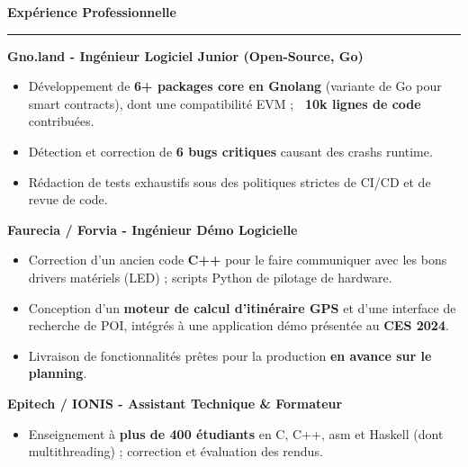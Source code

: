 \documentclass[9pt]{extarticle}
\begin{document}
\par\vspace{5pt}

{\large\bfseries Expérience Professionnelle}
\par\vspace{-8pt}
\rule{\linewidth}{0.4pt}
\par\vspace{5pt}

{\bfseries Gno.land - Ingénieur Logiciel Junior (Open-Source, Go)}
\begin{itemize}[noitemsep, topsep=0pt]
	\item Développement de {\bfseries 6+ packages core en Gnolang} (variante de Go pour smart contracts), dont une compatibilité EVM ; {\bfseries ~10k lignes de code} contribuées.
	\item Détection et correction de {\bfseries 6 bugs critiques} causant des crashs runtime.
	\item Rédaction de tests exhaustifs sous des politiques strictes de CI/CD et de revue de code.
\end{itemize}

\par\vspace{5pt}

{\bfseries Faurecia / Forvia - Ingénieur Démo Logicielle}
\begin{itemize}[noitemsep, topsep=0pt]
	\item Correction d'un ancien code {\bfseries C++} pour le faire communiquer avec les bons drivers matériels (LED) ; scripts Python de pilotage de hardware.
	\item Conception d'un {\bfseries moteur de calcul d'itinéraire GPS} et d'une interface de recherche de POI, intégrés à une application démo présentée au {\bfseries CES 2024}.
	\item Livraison de fonctionnalités prêtes pour la production {\bfseries en avance sur le planning}.
\end{itemize}

\par\vspace{5pt}

{\bfseries Epitech / IONIS - Assistant Technique \& Formateur}
\begin{itemize}[noitemsep, topsep=0pt]
	\item Enseignement à {\bfseries plus de 400 étudiants} en C, C++, asm et Haskell (dont multithreading) ; correction et évaluation des rendus.
\end{itemize}
\end{document}
